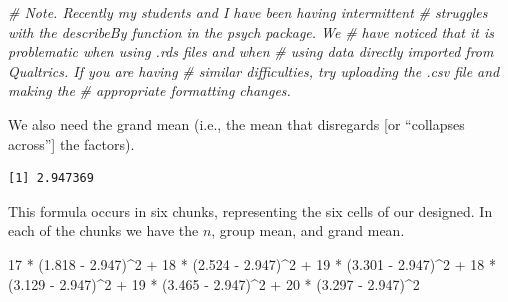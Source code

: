 \documentclass[
  11pt,
]{book}
\newenvironment{Shaded}{\begin{snugshade}}{\end{snugshade}}
\newcommand{\CommentTok}[1]{\textcolor[rgb]{0.56,0.35,0.01}{\textit{#1}}}
\newcommand{\DecValTok}[1]{\textcolor[rgb]{0.00,0.00,0.81}{#1}}
\newcommand{\FloatTok}[1]{\textcolor[rgb]{0.00,0.00,0.81}{#1}}
\newcommand{\FunctionTok}[1]{\textcolor[rgb]{0.00,0.00,0.00}{#1}}
\newcommand{\NormalTok}[1]{#1}
\newcommand{\SpecialCharTok}[1]{\textcolor[rgb]{0.00,0.00,0.00}{#1}}
\begin{document}
\begin{Shaded}
\begin{Highlighting}[]
\CommentTok{\# Note. Recently my students and I have been having intermittent}
\CommentTok{\# struggles with the describeBy function in the psych package. We}
\CommentTok{\# have noticed that it is problematic when using .rds files and when}
\CommentTok{\# using data directly imported from Qualtrics. If you are having}
\CommentTok{\# similar difficulties, try uploading the .csv file and making the}
\CommentTok{\# appropriate formatting changes.}
\end{Highlighting}
\end{Shaded}

We also need the grand mean (i.e., the mean that disregards {[}or ``collapses across''{]} the factors).

\begin{Shaded}
\end{Shaded}

\begin{verbatim}
[1] 2.947369
\end{verbatim}

This formula occurs in six chunks, representing the six cells of our designed. In each of the chunks we have the \(n\), group mean, and grand mean.

\begin{Shaded}
\begin{Highlighting}[]
\DecValTok{17} \SpecialCharTok{*}\NormalTok{ (}\FloatTok{1.818} \SpecialCharTok{{-}} \FloatTok{2.947}\NormalTok{)}\SpecialCharTok{\^{}}\DecValTok{2} \SpecialCharTok{+} \DecValTok{18} \SpecialCharTok{*}\NormalTok{ (}\FloatTok{2.524} \SpecialCharTok{{-}} \FloatTok{2.947}\NormalTok{)}\SpecialCharTok{\^{}}\DecValTok{2} \SpecialCharTok{+} \DecValTok{19} \SpecialCharTok{*}\NormalTok{ (}\FloatTok{3.301} \SpecialCharTok{{-}} \FloatTok{2.947}\NormalTok{)}\SpecialCharTok{\^{}}\DecValTok{2} \SpecialCharTok{+}
    \DecValTok{18} \SpecialCharTok{*}\NormalTok{ (}\FloatTok{3.129} \SpecialCharTok{{-}} \FloatTok{2.947}\NormalTok{)}\SpecialCharTok{\^{}}\DecValTok{2} \SpecialCharTok{+} \DecValTok{19} \SpecialCharTok{*}\NormalTok{ (}\FloatTok{3.465} \SpecialCharTok{{-}} \FloatTok{2.947}\NormalTok{)}\SpecialCharTok{\^{}}\DecValTok{2} \SpecialCharTok{+} \DecValTok{20} \SpecialCharTok{*}\NormalTok{ (}\FloatTok{3.297} \SpecialCharTok{{-}} \FloatTok{2.947}\NormalTok{)}\SpecialCharTok{\^{}}\DecValTok{2}
\end{Highlighting}
\end{Shaded}
\end{document}
